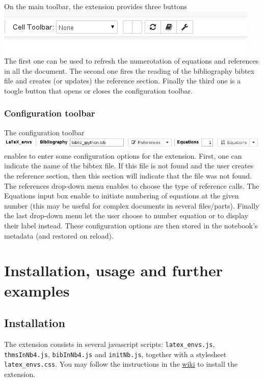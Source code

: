     On the main toolbar, the extension provides three buttons
\includegraphics{main_toolbar.png} The first one can be used to refresh
the numerotation of equations and references in all the document. The
second one fires the reading of the bibliography bibtex file and creates
(or updates) the reference section. Finally the third one is a toogle
button that opens or closes the configuration toolbar.

    \subsubsection{Configuration toolbar}\label{configuration-toolbar}

    The configuration toolbar \includegraphics{configuration_toolbar.png}
enables to enter some configuration options for the extension. First,
one can indicate the name of the bibtex file. If this file is not found
and the user creates the reference section, then this section will
indicate that the file was not found. The references drop-down menu
enables to choose the type of reference calls. The Equations input box
enable to initiate numbering of equations at the given number (this may
be useful for complex documents in several files/parts). Finally the
last drop-down menu let the user choose to number equation or to display
their label instead. These configuration options are then stored in the
notebook's metadata (and restored on reload).

    \section{Installation, usage and further
examples}\label{installation-usage-and-further-examples}

    \subsection{Installation}\label{installation}

    The extension consists in several javascript scripts:
\texttt{latex\_envs.js}, \texttt{thmsInNb4.js}, \texttt{bibInNb4.js} and
\texttt{initNb.js}, together with a stylesheet \texttt{latex\_envs.css}.
You may follow the instructions in the
\href{https://github.com/ipython-contrib/IPython-notebook-extensions/wiki}{wiki}
to install the extension.

